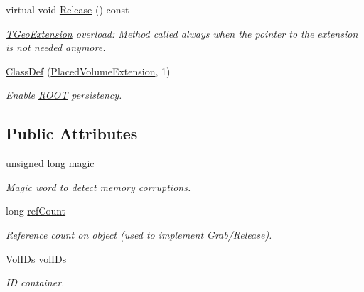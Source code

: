 \begin{DoxyCompactItemize}
virtual void \hyperlink{class_d_d4hep_1_1_geometry_1_1_placed_volume_extension_a92e8b1e394a8aa6dd5ccb94f30c58318}{Release} () const 
\begin{DoxyCompactList}\small\item\em \hyperlink{class_t_geo_extension}{TGeoExtension} overload: Method called always when the pointer to the extension is not needed anymore. \item\end{DoxyCompactList}\item 
\hyperlink{class_d_d4hep_1_1_geometry_1_1_placed_volume_extension_a947783c6c9088c7569f0fdd90a330a39}{ClassDef} (\hyperlink{class_d_d4hep_1_1_geometry_1_1_placed_volume_extension}{PlacedVolumeExtension}, 1)
\begin{DoxyCompactList}\small\item\em Enable \hyperlink{namespace_r_o_o_t}{ROOT} persistency. \item\end{DoxyCompactList}\end{DoxyCompactItemize}
\subsection*{Public Attributes}
\begin{DoxyCompactItemize}
\item 
unsigned long \hyperlink{class_d_d4hep_1_1_geometry_1_1_placed_volume_extension_a1da5d313250546dc6deb19ed39b9ee90}{magic}
\begin{DoxyCompactList}\small\item\em Magic word to detect memory corruptions. \item\end{DoxyCompactList}\item 
long \hyperlink{class_d_d4hep_1_1_geometry_1_1_placed_volume_extension_a4feb981d8c7a9cfdd75e525ee0cfd527}{refCount}
\begin{DoxyCompactList}\small\item\em Reference count on object (used to implement Grab/Release). \item\end{DoxyCompactList}\item 
\hyperlink{class_d_d4hep_1_1_geometry_1_1_placed_volume_extension_1_1_vol_i_ds}{VolIDs} \hyperlink{class_d_d4hep_1_1_geometry_1_1_placed_volume_extension_ad5f78671de81a717b16fdefd5483b153}{volIDs}
\begin{DoxyCompactList}\small\item\em ID container. \item\end{DoxyCompactList}\end{DoxyCompactItemize}


